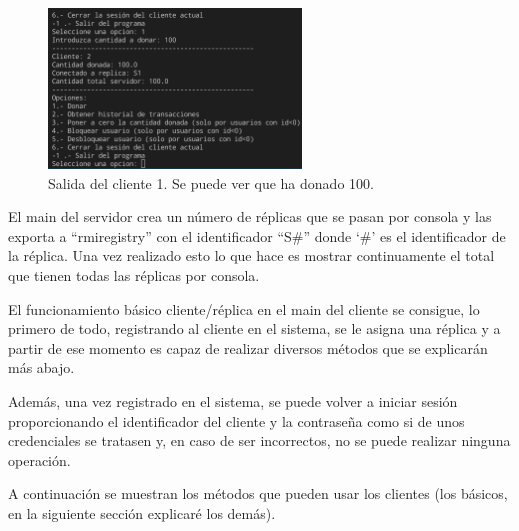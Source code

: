\documentclass{article}
\begin{document}
\begin{figure}[H]
    \centering
    \includegraphics[width=0.6\textwidth]{imagenes/donObligatorioC2.png}
    \caption{Salida del cliente 1. Se puede ver que ha donado 100.}
\end{figure}

El main del servidor crea un número de réplicas que se pasan por consola y las exporta a ``rmiregistry'' con el identificador ``S\#'' donde `\#' es el identificador de la réplica. Una vez realizado esto lo que hace es mostrar continuamente el total que tienen todas las réplicas por consola.

El funcionamiento básico cliente/réplica en el main del cliente se consigue, lo primero de todo, registrando al cliente en el sistema, se le asigna una réplica y a partir de ese momento es capaz de realizar diversos métodos que se explicarán más abajo.

Además, una vez registrado en el sistema, se puede volver a iniciar sesión proporcionando el identificador del cliente y la contraseña como si de unos credenciales se tratasen y, en caso de ser incorrectos, no se puede realizar ninguna operación.

A continuación se muestran los métodos que pueden usar los clientes (los básicos, en la siguiente sección explicaré los demás).
\end{document}
